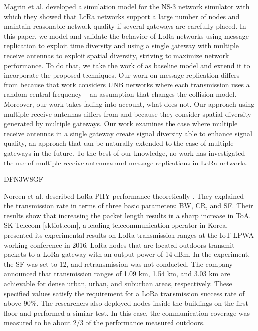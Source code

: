 Magrin et al.
\cite{magrin_performance_2017} developed a simulation model for the NS-3 network simulator with which they showed that LoRa networks support a large number of nodes and maintain reasonable network quality if several gateways are carefully placed.
In this paper,
	we model and validate the behavior of LoRa networks using message replication to exploit time diversity and using a single gateway with multiple receive antennas to exploit spatial diversity,
	striving to maximize network performance.
To do that,
	we take the work of \cite{georgiou_low_2017} as baseline model and extend it to incorporate the proposed techniques.
Our work on message replication differs from \cite{mo_optimization_2016} because that work considers UNB networks where each transmission uses a random central frequency – an assumption that changes the collision model.
Moreover,
	our work takes fading into account,
	what \cite{mo_optimization_2016} does not.
Our approach using multiple receive antennas differs from \cite{song_evaluation_2017} and \cite{magrin_performance_2017} because they consider spatial diversity generated by multiple gateways.
Our work examines the case where multiple receive antennas in a single gateway create signal diversity able to enhance signal quality,
	an approach that can be naturally extended to the case of multiple gateways in the future.
To the best of our knowledge,
	no work has investigated the use of multiple receive antennas and message replications in LoRa networks.

\cite{kim_experiencing_2019} DFN3W8GF


Noreen et al.
described LoRa PHY performance theoretically \cite{noreen_study_2017}.
They explained the transmission rate in terms of three basic parameters:
	BW,
	CR,
	and SF.
Their results show that increasing the packet length results in a sharp increase in ToA.
SK Telecom [sktiot.com],
	a leading telecommunication operator in Korea,
	presented its experimental results on LoRa transmission ranges at the IoT-LPWA working conference in 2016.
LoRa nodes that are located outdoors transmit packets to a LoRa gateway with an output power of 14 dBm.
In the experiment,
	the SF was set to 12,
	and retransmission was not conducted.
The company announced that transmission ranges of 1.09 km, 1.54 km,
	and 3.03 km are achievable for dense urban,
	urban,
	and suburban areas,
	respectively.
These specified values satisfy the requirement for a LoRa transmission success rate of above 90\%.
The researchers also deployed nodes inside the buildings on the first floor and performed a similar test.
In this case,
	the communication coverage was measured to be about 2/3 of the performance measured outdoors.

